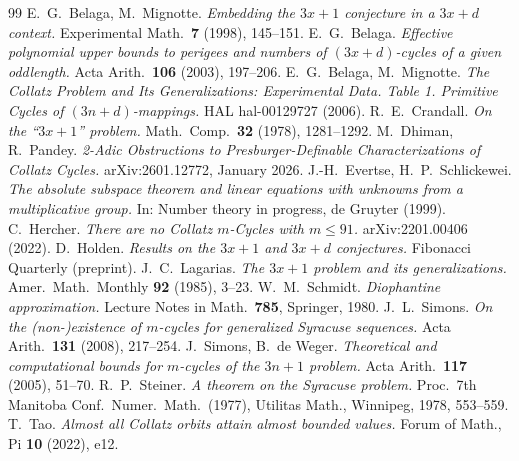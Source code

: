 \documentclass[11pt,a4paper]{article}
\theoremstyle{plain}
\theoremstyle{definition}
\begin{document}
\begin{thebibliography}{99}
\small
{} E.~G.~Belaga, M.~Mignotte. \emph{Embedding the $3x+1$ conjecture in a $3x+d$ context.} Experimental Math.\ \textbf{7} (1998), 145--151.
 E.~G.~Belaga. \emph{Effective polynomial upper bounds to perigees and numbers of $(3x+d)$-cycles of a given oddlength.} Acta Arith.\ \textbf{106} (2003), 197--206.
 E.~G.~Belaga, M.~Mignotte. \emph{The Collatz Problem and Its Generalizations: Experimental Data. Table 1. Primitive Cycles of $(3n+d)$-mappings.} HAL hal-00129727 (2006).
 R.~E.~Crandall. \emph{On the ``$3x+1$'' problem.} Math.\ Comp.\ \textbf{32} (1978), 1281--1292.
 M.~Dhiman, R.~Pandey. \emph{2-Adic Obstructions to Presburger-Definable Characterizations of Collatz Cycles.} arXiv:2601.12772, January 2026.
 J.-H.~Evertse, H.~P.~Schlickewei. \emph{The absolute subspace theorem and linear equations with unknowns from a multiplicative group.} In: Number theory in progress, de Gruyter (1999).
 C.~Hercher. \emph{There are no Collatz $m$-Cycles with $m \le 91$.} arXiv:2201.00406 (2022).
 D.~Holden. \emph{Results on the $3x+1$ and $3x+d$ conjectures.} Fibonacci Quarterly (preprint).
 J.~C.~Lagarias. \emph{The $3x+1$ problem and its generalizations.} Amer.\ Math.\ Monthly \textbf{92} (1985), 3--23.
 W.~M.~Schmidt. \emph{Diophantine approximation.} Lecture Notes in Math.\ \textbf{785}, Springer, 1980.
 J.~L.~Simons. \emph{On the (non-)existence of $m$-cycles for generalized Syracuse sequences.} Acta Arith.\ \textbf{131} (2008), 217--254.
 J.~Simons, B.~de Weger. \emph{Theoretical and computational bounds for $m$-cycles of the $3n+1$ problem.} Acta Arith.\ \textbf{117} (2005), 51--70.
 R.~P.~Steiner. \emph{A theorem on the Syracuse problem.} Proc.\ 7th Manitoba Conf.\ Numer.\ Math.\ (1977), Utilitas Math., Winnipeg, 1978, 553--559.
 T.~Tao. \emph{Almost all Collatz orbits attain almost bounded values.} Forum of Math., Pi \textbf{10} (2022), e12.
\end{thebibliography}
\end{document}
